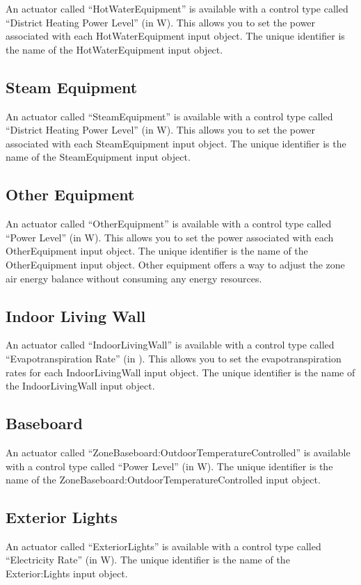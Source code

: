 An actuator called ``HotWaterEquipment'' is available with a control type called ``District Heating Power Level'' (in W). This allows you to set the power associated with each HotWaterEquipment input object. The unique identifier is the name of the HotWaterEquipment input object.

\subsection{Steam Equipment}\label{steam-equipment}

An actuator called ``SteamEquipment'' is available with a control type called ``District Heating Power Level'' (in W). This allows you to set the power associated with each SteamEquipment input object. The unique identifier is the name of the SteamEquipment input object.

\subsection{Other Equipment}\label{other-equipment}

An actuator called ``OtherEquipment'' is available with a control type called ``Power Level'' (in W). This allows you to set the power associated with each OtherEquipment input object. The unique identifier is the name of the OtherEquipment input object.  Other equipment offers a way to adjust the zone air energy balance without consuming any energy resources.

\subsection{Indoor Living Wall}\label{indoor-living-wall}

An actuator called ``IndoorLivingWall'' is available with a control type called ``Evapotranspiration Rate'' (in \si{\evapotranspirationRate}). This allows you to set the evapotranspiration rates for each IndoorLivingWall input object. The unique identifier is the name of the IndoorLivingWall input object.

\subsection{Baseboard}\label{baseboard}

An actuator called ``ZoneBaseboard:OutdoorTemperatureControlled'' is available with a control type called ``Power Level'' (in W). The unique identifier is the name of the ZoneBaseboard:OutdoorTemperatureControlled input object.

\subsection{Exterior Lights}\label{exterior-lights}

An actuator called ``ExteriorLights'' is available with a control type called ``Electricity Rate'' (in W). The unique identifier is the name of the Exterior:Lights input object.
